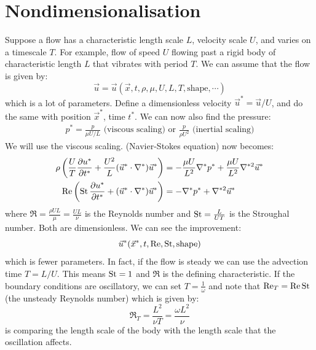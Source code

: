 \documentclass[../Main.tex]{subfiles}
\begin{document}
\section{Nondimensionalisation}
Suppose a flow has a characteristic length scale $L$, velocity scale $U$, and varies on a timescale $T$. For example, flow of speed $U$ flowing past a rigid body of characteristic length $L$ that vibrates with period $T$. We can assume that the flow is given by:
\begin{equation*}
    \vec{u} = \vec{u}(\vec{x}, t, \rho, \mu, U, L, T, \text{shape}, \cdots)
\end{equation*}
which is a lot of parameters. Define a dimensionless velocity $\vec{u}^* = \vec{u} / U$, and do the same with position $\vec{x}^*$, time $t^*$. We can now also find the pressure:
\begin{align*}
    p^* = \frac{p}{\mu U/L} \text{ (viscous scaling) or } \frac{p}{\rho U^2} \text{ (inertial scaling)}
\end{align*}
We will use the viscous scaling.  (Navier-Stokes equation) now becomes:
\begin{align}
    \rho \left(\frac{U}{T} \frac{\partial u^*}{\partial t^*} + \frac{U^2}{L} (\vec{u}^* \cdot \nabla^*) \vec{u}^*\right) &= -\frac{\mu U}{L^2} \nabla^* p^* + \frac{\mu U}{L^2} \nabla^{* 2} \vec{u}^* \nonumber \\
    \operatorname{Re} \left(\operatorname{St}\frac{\partial u^*}{\partial t^*} + (\vec{u}^* \cdot \nabla^*) \vec{u}^*\right) &= -\nabla^* p^* + \nabla^{* 2} \vec{u}^* \label{eqnNavierStokesDimless} \\
\end{align}
where $\Re = \frac{\rho U L}{\mu} = \frac{UL}{\nu}$ is the Reynolds number and $\operatorname{St} = \frac{L}{UT}$ is the Stroughal number. Both are dimensionless. We can see the improvement:
\begin{equation*}
    \vec{u}^*(\vec{x}^*, t, \operatorname{Re}, \operatorname{St}, \text{shape})
\end{equation*}
which is fewer parameters. In fact, if the flow is steady we can use the advection time $T = L / U$. This means $\operatorname{St} = 1$ and $\Re$ is the defining characteristic. If the boundary conditions are oscillatory, we can set $T = \frac1\omega$ and note that $\operatorname{Re}_T = \operatorname{Re}\operatorname{St}$ (the unsteady Reynolds number) which is given by:
\begin{equation*}
    \Re_T = \frac{L^2}{\nu T} = \frac{\omega L^2}{\nu}
\end{equation*}
is comparing the length scale of the body with the length scale that the oscillation affects.
\end{document}
